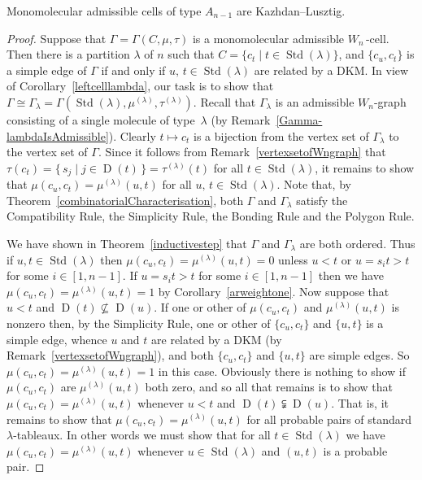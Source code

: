 \documentclass[ALCO,ThmDefs,Unicode,epreuves]{cedram}
\DeclareMathOperator{\STD}{Std}
\DeclareMathOperator{\D}{D}
\begin{document}
\begin{prop}\label{monomolecularadmcellsareKL}
Monomolecular admissible cells of type $A_{n-1}$ are Kazhdan--Lusztig.
\end{prop}

\begin{proof}
Suppose that $\Gamma=\Gamma(C,\mu,\tau)$ is a monomolecular admissible $W_n\,$-cell.
Then there is a partition $\lambda$ of $n$ such that
$C=\{c_t\mid t\in\STD(\lambda)\}$, and
$\{c_u,c_t\}$ is a simple edge of $\Gamma$
if and only if $u,\,t\in\STD(\lambda)$ are related by a DKM.
In view of Corollary~\ref{leftcelllambda}, our task is to show that
$\Gamma\cong \Gamma_\lambda=\Gamma(\STD(\lambda),\mu^{(\lambda)},\tau^{(\lambda)})$.
Recall that $\Gamma_\lambda$ is an admissible $W_n$-graph consisting
of a single molecule of type~$\lambda$ (by Remark~\ref{Gamma-lambdaIsAdmissible}).
Clearly $t\mapsto c_t$ is a bijection from the vertex set of $\Gamma_\lambda$
to the vertex set of $\Gamma$.
Since it follows from Remark~\ref{vertexsetofWngraph} that
$\tau(c_t) = \{\,s_j\mid j\in\D(t)\,\} = \tau^{(\lambda)}(t)$ for all $t\in\STD(\lambda)$, it remains
to show that $\mu(c_u,c_t)=\mu^{(\lambda)}(u,t)$ for all $u,\,t\in\STD(\lambda)$.
Note that, by Theorem~\ref{combinatorialCharacterisation}, both $\Gamma$ and
$\Gamma_\lambda$ satisfy the
Compatibility Rule, the Simplicity Rule,
the Bonding Rule and the Polygon Rule.

We have shown in Theorem~\ref{inductivestep} that $\Gamma$ and
$\Gamma_\lambda$ are both ordered. Thus if $u,t\in\STD(\lambda)$
then $\mu(c_u,c_t)=\mu^{(\lambda)}(u,t)=0$
unless $u<t$ or $u=s_it>t$ for some $i\in[1,n-1]$.
If $u=s_it>t$ for some $i\in[1,n-1]$ then we have
$\mu(c_u,c_t)=\mu^{(\lambda)}(u,t)=1$ by Corollary~\ref{arweightone}.
Now suppose that $u<t$ and $\D(t)\nsubseteq\D(u)$. If one
or other of $\mu(c_u,c_t)$ and $\mu^{(\lambda)}(u,t)$ is nonzero then,
by the Simplicity Rule, one or other of
$\{c_u,c_t\}$ and $\{u,t\}$ is a simple edge, whence $u$ and $t$ are
related by a DKM
(by Remark~\ref{vertexsetofWngraph}), and
both $\{c_u,c_t\}$ and $\{u,t\}$ are simple edges. So
$\mu(c_u,c_t)=\mu^{(\lambda)}(u,t)=1$ in this case. Obviously there
is nothing to show if $\mu(c_u,c_t)$ are $\mu^{(\lambda)}(u,t)$ both zero,
and so all that remains is to show that $\mu(c_u,c_t)=\mu^{(\lambda)}(u,t)$
whenever $u<t$ and $\D(t)\subsetneqq\D(u)$. That is, it remains to show
that $\mu(c_u,c_t)=\mu^{(\lambda)}(u,t)$ for all probable pairs of
standard $\lambda$-tableaux. In other words we must show that for all
$t\in\STD(\lambda)$ we have $\mu(c_u,c_t)=\mu^{(\lambda)}(u,t)$ whenever
$u\in\STD(\lambda)$ and $(u,t)$ is a probable pair.


\end{proof}
\end{document}
